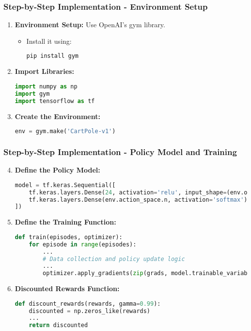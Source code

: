 \documentclass[aspectratio=169]{beamer}
\begin{document}
\begin{frame}[fragile]
    \frametitle{Step-by-Step Implementation - Environment Setup}
    \begin{enumerate}
        \item \textbf{Environment Setup:} Use OpenAI's gym library.
        \begin{itemize}
            \item Install it using: 
            \begin{lstlisting}[language=bash]
pip install gym
            \end{lstlisting}
        \end{itemize}
        
        \item \textbf{Import Libraries:}
        \begin{lstlisting}[language=python]
import numpy as np
import gym
import tensorflow as tf
        \end{lstlisting}
        
        \item \textbf{Create the Environment:}
        \begin{lstlisting}[language=python]
env = gym.make('CartPole-v1')
        \end{lstlisting}
    \end{enumerate}
\end{frame}

\begin{frame}[fragile]
    \frametitle{Step-by-Step Implementation - Policy Model and Training}
    \begin{enumerate}
        \setcounter{enumi}{3}
        \item \textbf{Define the Policy Model:}
        \begin{lstlisting}[language=python]
model = tf.keras.Sequential([
    tf.keras.layers.Dense(24, activation='relu', input_shape=(env.observation_space.shape[0],)),
    tf.keras.layers.Dense(env.action_space.n, activation='softmax')
])
        \end{lstlisting}
        
        \item \textbf{Define the Training Function:}
        \begin{lstlisting}[language=python]
def train(episodes, optimizer):
    for episode in range(episodes):
        ...
        # Data collection and policy update logic
        ...
        optimizer.apply_gradients(zip(grads, model.trainable_variables))
        \end{lstlisting}
        
        \item \textbf{Discounted Rewards Function:}
        \begin{lstlisting}[language=python]
def discount_rewards(rewards, gamma=0.99):
    discounted = np.zeros_like(rewards)
    ...
    return discounted
        \end{lstlisting}
    \end{enumerate}
\end{frame}
\end{document}
